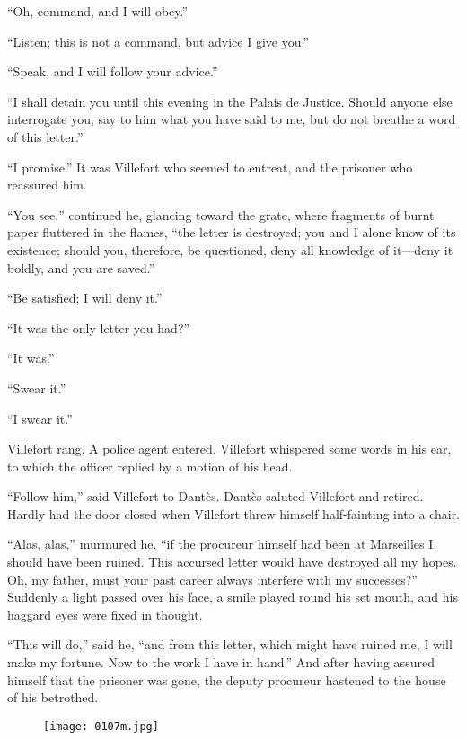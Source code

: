 “Oh, command, and I will obey.”

“Listen; this is not a command, but advice I give you.”

“Speak, and I will follow your advice.”

“I shall detain you until this evening in the Palais de Justice. Should
anyone else interrogate you, say to him what you have said to me, but
do not breathe a word of this letter.”

“I promise.” It was Villefort who seemed to entreat, and the prisoner
who reassured him.

“You see,” continued he, glancing toward the grate, where fragments of
burnt paper fluttered in the flames, “the letter is destroyed; you and
I alone know of its existence; should you, therefore, be questioned,
deny all knowledge of it—deny it boldly, and you are saved.”

“Be satisfied; I will deny it.”

“It was the only letter you had?”

“It was.”

“Swear it.”

“I swear it.”

Villefort rang. A police agent entered. Villefort whispered some words
in his ear, to which the officer replied by a motion of his head.

“Follow him,” said Villefort to Dantès. Dantès saluted Villefort and
retired. Hardly had the door closed when Villefort threw himself
half-fainting into a chair.

“Alas, alas,” murmured he, “if the procureur himself had been at
Marseilles I should have been ruined. This accursed letter would have
destroyed all my hopes. Oh, my father, must your past career always
interfere with my successes?” Suddenly a light passed over his face, a
smile played round his set mouth, and his haggard eyes were fixed in
thought.

“This will do,” said he, “and from this letter, which might have ruined
me, I will make my fortune. Now to the work I have in hand.” And after
having assured himself that the prisoner was gone, the deputy procureur
hastened to the house of his betrothed.

\begin{figure}[ht]
\texttt{[image: 0107m.jpg]}
\end{figure}
